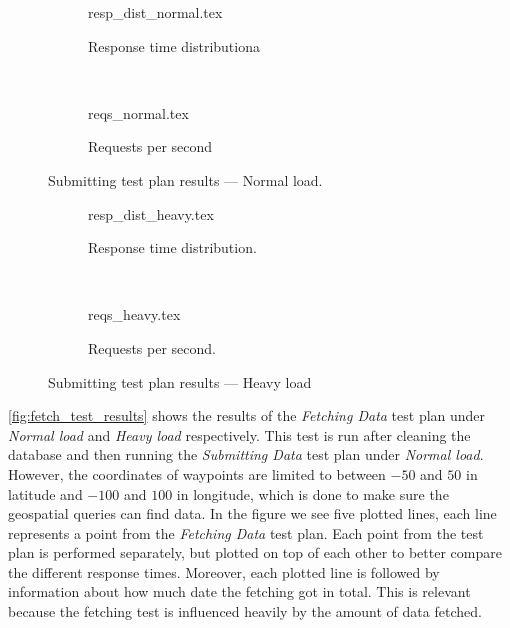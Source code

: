 \begin{figure}[!htb]
    \centering
    \begin{subfigure}[b]{\textwidth}
        \footnotesize
        \centering
        {resp_dist_normal.tex}
        \caption{Response time distributiona}\label{fig:submit_resp_t_dist_normal}
    \end{subfigure}\\
    \begin{subfigure}[b]{\textwidth}
        \footnotesize
        \centering
        {reqs_normal.tex}
        \caption{Requests per second}\label{fig:submit_reqs_p_sec_normal}
    \end{subfigure}
    \caption{Submitting test plan results --- Normal load.}\label{fig:submit_test_results_normal}
\end{figure}
\begin{figure}[!htb]
    \begin{subfigure}[b]{\textwidth}
        \footnotesize
        \centering
        {resp_dist_heavy.tex}
        \caption{Response time distribution.}\label{fig:submit_resp_t_dist_heavy}
    \end{subfigure}\\
    \begin{subfigure}[b]{\textwidth}
        \footnotesize
        \centering
        {reqs_heavy.tex}
        \caption{Requests per second.}\label{fig:submit_reqs_p_sec_heavy}
    \end{subfigure}
    \caption{Submitting test plan results --- Heavy load}\label{fig:submit_test_results_heavy}
\end{figure}

\bigskip
\cref{fig:fetch_test_results} shows the results of the \textit{Fetching Data} test plan under \textit{Normal load} and \textit{Heavy load} respectively.
This test is run after cleaning the database and then running the \textit{Submitting Data} test plan under \textit{Normal load}.
However, the coordinates of waypoints are limited to between $-50$ and $50$ in latitude and $-100$ and $100$ in longitude, which is done to make sure the geospatial queries can find data.
In the figure we see five plotted lines, each line represents a point from the \textit{Fetching Data} test plan.
Each point from the test plan is performed separately, but plotted on top of each other to better compare the different response times.
Moreover, each plotted line is followed by information about how much date the fetching got in total.
This is relevant because the fetching test is influenced heavily by the amount of data fetched.

